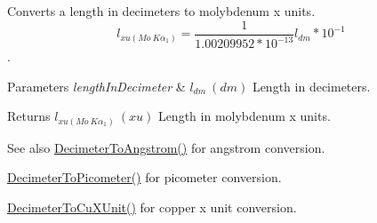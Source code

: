 Converts a length in decimeters to molybdenum x units. \[ l_{xu(Mo\ K\alpha_1)}=\frac{1}{1.00209952*10^{-13}} l_{dm} * 10^{-1}\]. 


\begin{DoxyParams}{Parameters}
{\em length\+In\+Decimeter} & $ l_{dm}\ (dm)$ Length in decimeters. \\
\hline
\end{DoxyParams}
\begin{DoxyReturn}{Returns}
$ l_{xu(Mo\ K\alpha_1)}\ (xu)$ Length in molybdenum x units. 
\end{DoxyReturn}
\begin{DoxySeeAlso}{See also}
\mbox{\hyperlink{group___e_g_x_math-_conversions-_length_conversions-_s_i-_decimeter-_non-_s_i_gaffa5876e4f15bc859c369e8bfb9e4183}{Decimeter\+To\+Angstrom()}} for angstrom conversion. 

\mbox{\hyperlink{group___e_g_x_math-_conversions-_length_conversions-_s_i-_decimeter-_s_i_gaac5fa4b7b538abe2d19f33e131e9bbde}{Decimeter\+To\+Picometer()}} for picometer conversion. 

\mbox{\hyperlink{group___e_g_x_math-_conversions-_length_conversions-_s_i-_decimeter-_non-_s_i_gab595b2398e8e838922b4591308466e87}{Decimeter\+To\+Cu\+X\+Unit()}} for copper x unit conversion. 
\end{DoxySeeAlso}
